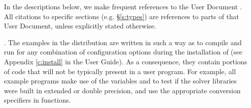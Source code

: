 In the descriptions below, we make frequent references to the {\cvode}
User Document \cite{cvode_ug}.  All citations to specific sections
(e.g. \S\ref{s:types}) are references to parts of that User Document, unless
explicitly stated otherwise.

\vspace{0.2in}.
The examples in the {\cvode} distribution are written in such a way as
to compile and run for any combination of configuration options during
the installation of {\sundials} (see Appendix \ref{c:install} in the User Guide).
As a consequence, they contain portions of code that will not be typically present
in a user program. For example, all {\CC} example programs make use of the
variables  and 
to test if the solver libraries were built in extended or double precision,
and use the appropriate conversion specifiers in  functions.
